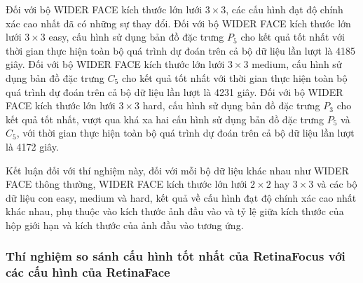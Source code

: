 {    \noindent
    Đối với bộ WIDER FACE kích thước lớn lưới $3 \times 3$, các cấu hình đạt độ chính xác cao nhất đã có những sự thay đổi.
    Đối với bộ WIDER FACE kích thước lớn lưới $3 \times 3$ easy, cấu hình sử dụng bản đồ đặc trưng ${P}_{5}$ cho kết quả tốt nhất với thời gian thực hiện toàn bộ quá trình dự đoán trên cả bộ dữ liệu lần lượt là 4185 giây.
    Đối với bộ WIDER FACE kích thước lớn lưới $3 \times 3$ medium, cấu hình sử dụng bản đồ đặc trưng ${C}_{5}$ cho kết quả tốt nhất với thời gian thực hiện toàn bộ quá trình dự đoán trên cả bộ dữ liệu lần lượt là 4231 giây.
    Đối với bộ WIDER FACE kích thước lớn lưới $3 \times 3$ hard, cấu hình sử dụng bản đồ đặc trưng ${P}_{3}$ cho kết quả tốt nhất, vượt qua khá xa hai cấu hình sử dụng bản đồ đặc trưng ${P}_{5}$ và ${C}_{5}$, với thời gian thực hiện toàn bộ quá trình dự đoán trên cả bộ dữ liệu lần lượt là 4172 giây.

    \noindent
    Kết luận đối với thí nghiệm này, đối với mỗi bộ dữ liệu khác nhau như WIDER FACE thông thường, WIDER FACE kích thước lớn lưới $2 \times 2$ hay $3 \times 3$ và các bộ dữ liệu con easy, medium và hard, kết quả về cấu hình đạt độ chính xác cao nhất khác nhau, phụ thuộc vào kích thước ảnh đầu vào và tỷ lệ giữa kích thước của hộp giới hạn và kích thước của ảnh đầu vào tương ứng.

    \subsubsection*{Thí nghiệm so sánh cấu hình tốt nhất của RetinaFocus với các cấu hình của RetinaFace}

}
